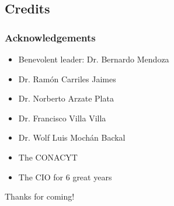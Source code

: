 \documentclass{beamer}
\begin{document}
\subsection{Credits}
\begin{frame}
\frametitle{Acknowledgements}
\begin{itemize}
\item Benevolent leader: Dr. Bernardo Mendoza
\item Dr. Ram\'on Carriles Jaimes
\item Dr. Norberto Arzate Plata
\item Dr. Francisco Villa Villa
\item Dr. Wolf Luis Moch\'an Backal
\item The CONACYT
\item The CIO for 6 great years
\end{itemize}
\begin{center}
\vspace{3em}
{\huge Thanks for coming!}
\end{center}
\end{frame}
\end{document}
